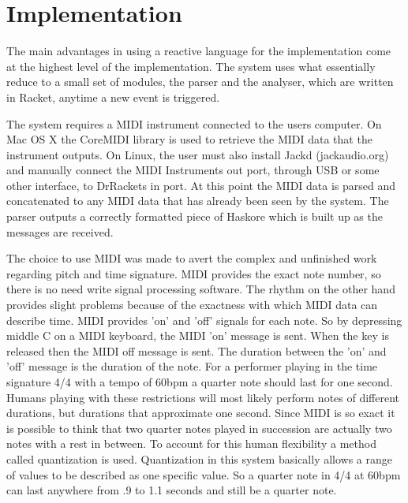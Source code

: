 \documentclass[12pt]{ucthesis}
\begin{document}
{%

\chapter{Implementation}
\label{Implementation}
The main advantages in using a reactive language for the implementation come at the highest level of the implementation. The system uses what essentially reduce to a small set of modules, the parser and the analyser, which are written in Racket, anytime a new event is triggered. 

The system requires a MIDI instrument connected to the users computer. On Mac OS X the CoreMIDI library is used to retrieve the MIDI data that the instrument outputs. On Linux, the user must also install Jackd (jackaudio.org) and manually connect the MIDI Instruments out port, through USB or some other interface, to DrRackets in port. At this point the MIDI data is parsed and concatenated to any MIDI data that has already been seen by the system. The parser outputs a correctly formatted piece of Haskore which is built up as the messages are received. 

The choice to use MIDI was made to avert the complex and unfinished work regarding pitch and time signature. MIDI provides the exact note number, so there is no need write signal processing software. The rhythm on the other hand provides slight problems because of the exactness with which MIDI data can describe time. MIDI provides 'on' and 'off' signals for each note. So by depressing middle C on a MIDI keyboard, the MIDI 'on' message is sent. When the key is released then the MIDI off message is sent. The duration between the 'on' and 'off' message is the duration of the note. For a performer playing in the time signature 4/4 with a tempo of 60bpm a quarter note should last for one second. Humans playing with these restrictions will most likely perform notes of different durations, but durations that approximate one second. Since MIDI is so exact it is possible to think that two quarter notes played in succession are actually two notes with a rest in between. To account for this human flexibility a method called quantization is used. Quantization in this system basically allows a range of values to be described as one specific value. So a quarter note in 4/4 at 60bpm can last anywhere from .9 to 1.1 seconds and still be a quarter note. 

}
\end{document}
